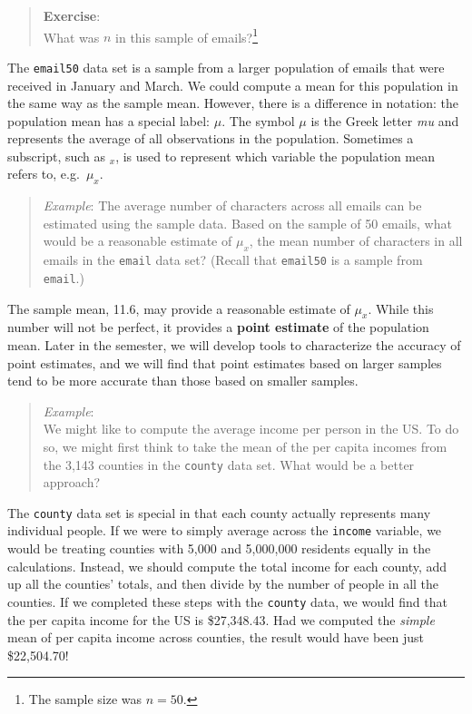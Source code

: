 \documentclass[
]{book}
\begin{document}
\begin{quote}
\textbf{Exercise}:\\
What was \(n\) in this sample of emails?\footnote{The sample size was \(n=50\).}
\end{quote}

The \texttt{email50} data set is a sample from a larger population of emails that were received in January and March. We could compute a mean for this population in the same way as the sample mean. However, there is a difference in notation: the population mean has a special label: \(\mu\). The symbol \(\mu\) is the Greek letter \emph{mu} and represents the average of all observations in the population. Sometimes a subscript, such as \(_x\), is used to represent which variable the population mean refers to, e.g.~\(\mu_x\).

\begin{quote}
\emph{Example}:
The average number of characters across all emails can be estimated using the sample data. Based on the sample of 50 emails, what would be a reasonable estimate of \(\mu_x\), the mean number of characters in all emails in the \texttt{email} data set? (Recall that \texttt{email50} is a sample from \texttt{email}.)
\end{quote}

The sample mean, 11.6, may provide a reasonable estimate of \(\mu_x\). While this number will not be perfect, it provides a \textbf{point estimate} of the population mean. Later in the semester, we will develop tools to characterize the accuracy of point estimates, and we will find that point estimates based on larger samples tend to be more accurate than those based on smaller samples.

\begin{quote}
\emph{Example}:\\
We might like to compute the average income per person in the US. To do so, we might first think to take the mean of the per capita incomes from the 3,143 counties in the \texttt{county} data set. What would be a better approach?
\end{quote}

The \texttt{county} data set is special in that each county actually represents many individual people. If we were to simply average across the \texttt{income} variable, we would be treating counties with 5,000 and 5,000,000 residents equally in the calculations. Instead, we should compute the total income for each county, add up all the counties' totals, and then divide by the number of people in all the counties. If we completed these steps with the \texttt{county} data, we would find that the per capita income for the US is \$27,348.43. Had we computed the \emph{simple} mean of per capita income across counties, the result would have been just \$22,504.70!
\end{document}

